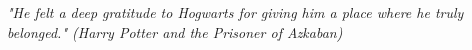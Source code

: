 \thispagestyle{empty}

\begin{center}

\mbox{}


\begin{flushright}
\textit{"He felt a deep gratitude to Hogwarts for giving him a place where he truly belonged."
(Harry Potter and the Prisoner of Azkaban)}
\end{flushright}

\newpage

\end{center}
